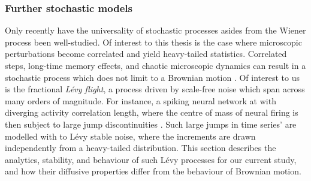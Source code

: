 \subsubsection{Further stochastic models}
Only recently have the universality of stochastic processes asides from the Wiener process been well-studied. Of interest to this thesis is the case where microscopic perturbations become correlated and yield heavy-tailed statistics. Correlated steps, long-time memory effects, and chaotic microscopic dynamics can result in a stochastic process which does not limit to a Brownian motion \cite{Brevitt2025, Klages2013}. Of interest to us is the fractional \textit{Lévy flight}, a process driven by scale-free noise which span across many orders of magnitude. For instance, a spiking neural network at with diverging activity correlation length, where the centre of mass of neural firing is then subject to large jump discontinuities \cite{La_Camera_2022_meanfieldneuron, qi_fractional_2022, qi_fractional_2022}. Such large jumps in time series' are modelled with to Lévy stable noise, where the increments are drawn independently from a heavy-tailed distribution. This section describes the analytics, stability, and behaviour of such Lévy processes for our current study, and how their diffusive properties differ from the behaviour of Brownian motion.

